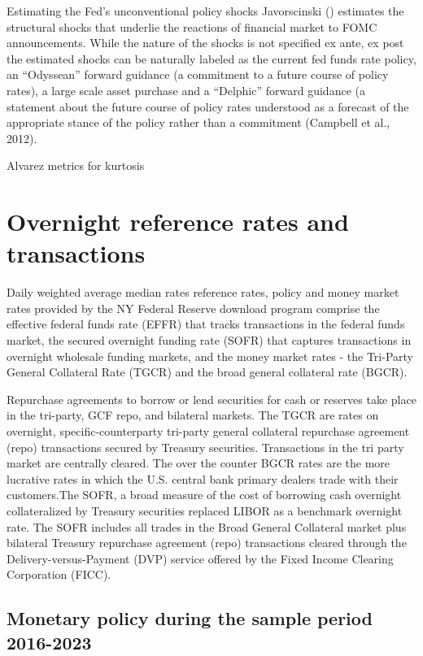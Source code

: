 \documentclass[
]{article}
\begin{document}
Estimating the Fed's unconventional policy shocks Javorscinski () estimates the structural shocks that underlie the reactions of financial market to FOMC announcements. While the nature of the shocks is not specified ex ante, ex post the estimated shocks can be naturally labeled as the current fed funds rate policy, an ``Odyssean'' forward guidance (a commitment to a future course of policy rates), a large scale asset purchase and a ``Delphic'' forward guidance (a statement about the future course of policy rates understood as a forecast of the appropriate stance of the policy rather than a commitment (Campbell et al., 2012).

Alvarez metrics for kurtosis

\hypertarget{overnight-reference-rates-and-transactions}{%
\section{Overnight reference rates and transactions}\label{overnight-reference-rates-and-transactions}}

Daily weighted average median rates reference rates, policy and money market rates provided by the NY Federal Reserve download program comprise the effective federal funds rate (EFFR) that tracks transactions in the federal funds market, the secured overnight funding rate (SOFR) that captures transactions in overnight wholesale funding markets, and the money market rates - the Tri-Party General Collateral Rate (TGCR) and the broad general collateral rate (BGCR).

Repurchase agreements to borrow or lend securities for cash or reserves take place in the tri-party, GCF repo, and bilateral markets. The TGCR are rates on overnight, specific-counterparty tri-party general collateral repurchase agreement (repo) transactions secured by Treasury securities. Transactions in the tri party market are centrally cleared. The over the counter BGCR rates are the more lucrative rates in which the U.S. central bank primary dealers trade with their customers.The SOFR, a broad measure of the cost of borrowing cash overnight collateralized by Treasury securities replaced LIBOR as a benchmark overnight rate. The SOFR includes all trades in the Broad General Collateral market plus bilateral Treasury repurchase agreement (repo) transactions cleared through the Delivery-versus-Payment (DVP) service offered by the Fixed Income Clearing Corporation (FICC).

\hypertarget{monetary-policy-during-the-sample-period-2016-2023}{%
\subsection{Monetary policy during the sample period 2016-2023}\label{monetary-policy-during-the-sample-period-2016-2023}}
\end{document}
